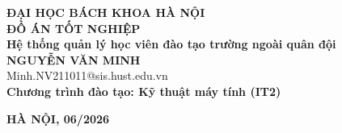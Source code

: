 \documentclass[DoAn.tex]{subfiles}
\begin{document}
\begin{titlepage}
\thispagestyle{empty}
\begin{center}

{\textbf{\large ĐẠI HỌC BÁCH KHOA HÀ NỘI}}\\[1.5cm]

{\textbf{\huge ĐỒ ÁN TỐT NGHIỆP}}\\[0.8cm]
{\textbf{\Large Hệ thống quản lý học viên đào tạo trường ngoài quân đội}}\\[0.8cm]

{\textbf{\large NGUYỄN VĂN MINH}}\\
{\large Minh.NV211011@sis.hust.edu.vn}\\[0.4cm]

{\textbf{\large Chương trình đào tạo: Kỹ thuật máy tính (IT2)}}\\[1cm]

\vfill

\begin{table}[H]
\centering
{}
\end{table}

\vfill
{\textbf{\large HÀ NỘI, 06/2026}}
\end{center}

\end{titlepage}
\end{document}
